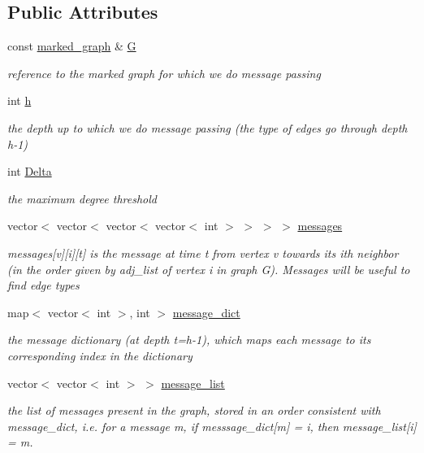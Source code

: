 \subsection*{Public Attributes}
\begin{DoxyCompactItemize}
\item 
const \hyperlink{classmarked__graph}{marked\+\_\+graph} \& \hyperlink{classgraph__message_abffce6d6a7868da0e747425569759f0f}{G}
\begin{DoxyCompactList}\small\item\em reference to the marked graph for which we do message passing \end{DoxyCompactList}\item 
int \hyperlink{classgraph__message_a934d63ed7275c211e13c6fb68824ed46}{h}
\begin{DoxyCompactList}\small\item\em the depth up to which we do message passing (the type of edges go through depth h-\/1) \end{DoxyCompactList}\item 
int \hyperlink{classgraph__message_a45dfd061b7bc73572e5132fbf66efd55}{Delta}
\begin{DoxyCompactList}\small\item\em the maximum degree threshold \end{DoxyCompactList}\item 
vector$<$ vector$<$ vector$<$ vector$<$ int $>$ $>$ $>$ $>$ \hyperlink{classgraph__message_a06a1d1ab91b4891c65ea80205566f800}{messages}
\begin{DoxyCompactList}\small\item\em messages\mbox{[}v\mbox{]}\mbox{[}i\mbox{]}\mbox{[}t\mbox{]} is the message at time t from vertex v towards its ith neighbor (in the order given by adj\+\_\+list of vertex i in graph G). Messages will be useful to find edge types \end{DoxyCompactList}\item 
map$<$ vector$<$ int $>$, int $>$ \hyperlink{classgraph__message_a7890d2dff06b9de6f98734c69d8fbcfd}{message\+\_\+dict}
\begin{DoxyCompactList}\small\item\em the message dictionary (at depth t=h-\/1), which maps each message to its corresponding index in the dictionary \end{DoxyCompactList}\item 
vector$<$ vector$<$ int $>$ $>$ \hyperlink{classgraph__message_aa497f561e976cf58cc554a77e0601d8f}{message\+\_\+list}
\begin{DoxyCompactList}\small\item\em the list of messages present in the graph, stored in an order consistent with message\+\_\+dict, i.\+e. for a message m, if messsage\+\_\+dict\mbox{[}m\mbox{]} = i, then message\+\_\+list\mbox{[}i\mbox{]} = m. \end{DoxyCompactList}\end{DoxyCompactItemize}


